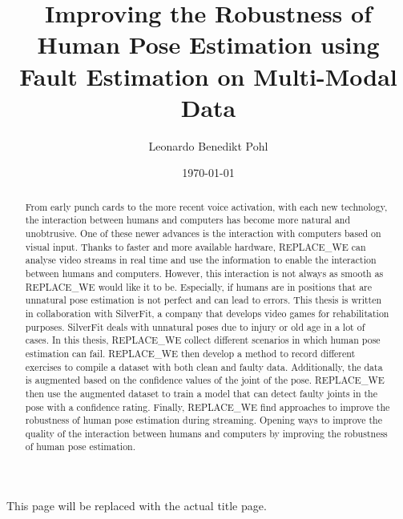 
\title{Improving the Robustness of Human Pose Estimation using Fault Estimation on Multi-Modal Data}
\author{Leonardo Benedikt Pohl}

\date{\today}

This page will be replaced with the actual title page.

\clearpage

\begin{abstract}
    
  From early punch cards to the more recent voice activation, with each new technology, the interaction between humans and computers has become more natural and unobtrusive. One of these newer advances is the interaction with computers based on visual input. Thanks to faster and more available hardware, REPLACE_WE can analyse video streams in real time and use the information to enable the interaction between humans and computers. However, this interaction is not always as smooth as REPLACE_WE would like it to be. Especially, if humans are in positions that are unnatural pose estimation is not perfect and can lead to errors. This thesis is written in collaboration with SilverFit, a company that develops video games for rehabilitation purposes. SilverFit deals with unnatural poses due to injury or old age in a lot of cases. In this thesis, REPLACE_WE collect different scenarios in which human pose estimation can fail. REPLACE_WE then develop a method to record different exercises to compile a dataset with both clean and faulty data.  Additionally, the data is augmented based on the confidence values of the joint of the pose. REPLACE_WE then use the augmented dataset to train a model that can detect faulty joints in the pose with a confidence rating. Finally, REPLACE_WE find approaches to improve the robustness of human pose estimation during streaming. Opening ways to improve the quality of the interaction between humans and computers by improving the robustness of human pose estimation.
   
\end{abstract}
